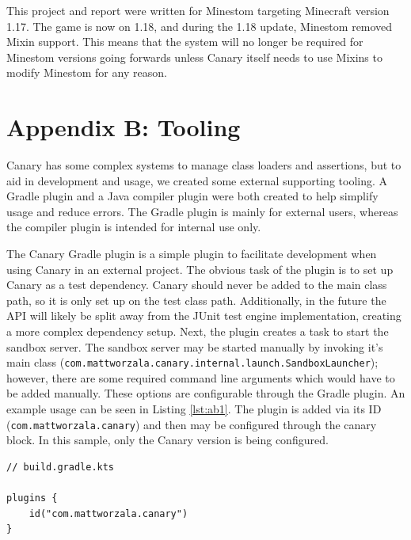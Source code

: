 \documentclass[12pt]{article}
\def\code#1{\texttt{#1}}
\begin{document}
\begin{onehalfspacing}



This project and report were written for Minestom targeting Minecraft
version 1.17. The game is now on 1.18, and during the 1.18 update,
Minestom removed Mixin support. This means that the system will no
longer be required for Minestom versions going forwards unless Canary
itself needs to use Mixins to modify Minestom for any reason.

\newpage
{}
\section*{Appendix B: Tooling}\label{appendixb}

Canary has some complex systems to manage class loaders and assertions,
but to aid in development and usage, we created some external supporting
tooling. A Gradle plugin and a Java compiler plugin were both created to
help simplify usage and reduce errors. The Gradle plugin is mainly for
external users, whereas the compiler plugin is intended for internal use
only.

The Canary Gradle plugin is a simple plugin to facilitate development
when using Canary in an external project. The obvious task of the plugin
is to set up Canary as a test dependency. Canary should never be added
to the main class path, so it is only set up on the test class path.
Additionally, in the future the API will likely be split away from the
JUnit test engine implementation, creating a more complex dependency
setup. Next, the plugin creates a task to start the sandbox server. The
sandbox server may be started manually by invoking it's main class
(\code{com.mattworzala.canary.internal.launch.SandboxLauncher}); however, there
are some required command line arguments which would have to be added
manually. These options are configurable through the Gradle plugin. An
example usage can be seen in Listing \ref{lst:ab1}. The plugin is added via its
ID (\code{com.mattworzala.canary}) and then may be configured through the
canary block. In this sample, only the Canary version is being
configured.

\begin{listing}[H]
\begin{verbatim}
// build.gradle.kts

plugins {
    id("com.mattworzala.canary")
}


\end{verbatim}
\end{listing}
\end{onehalfspacing}
\end{document}
